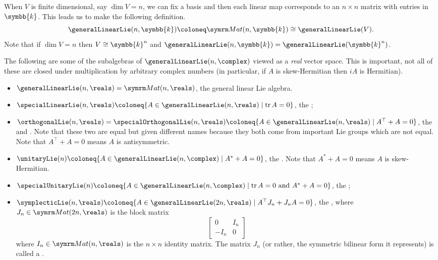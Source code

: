 \documentclass[fleqn]{NotesClass}
\renewcommand{\field}{\symbb{k}}
\newcommand{\isomorphic}{\cong}
\newcommand{\trans}{{\top}}
\newcommand{\hermit}{*}
\DeclareMathOperator{\tr}{tr}
\begin{document}
    When \(V\) is finite dimensional, say \(\dim V = n\), we can fix a basis and then each linear map corresponds to an \(n \times n\) matrix with entries in \(\field\).
    This leads us to make the following definition.
    \begin{equation}
        \generalLinearLie(n, \field) \coloneq \matrices{n}{\field} \isomorphic \generalLinearLie(V).
    \end{equation}
    Note that if \(\dim V = n\) then \(V \isomorphic \field^n\) and \(\generalLinearLie(n, \field) = \generalLinearLie(\field^n)\).
    
    The following are some of the subalgebras of \(\generalLinearLie(n, \complex)\) viewed as a \emph{real} vector space.
    This is important, not all of these are closed under multiplication by arbitrary complex numbers (in particular, if \(A\) is skew-Hermitian then \(iA\) is Hermitian).
    \begin{itemize}
        \item \(\generalLinearLie(n, \reals) = \matrices{n}{\reals}\), the general linear Lie algebra.
        \item \(\specialLinearLie(n, \reals) \coloneq \{A \in \generalLinearLie(n, \reals) \mid \tr A = 0\}\), the ;
        \item \(\orthogonalLie(n, \reals) = \specialOrthogonalLie(n, \reals) \coloneq \{A \in \generalLinearLie(n, \reals) \mid A^{\trans} + A = 0\}\), the  and .
        Note that these two are equal but given different names because they both come from important Lie groups which are not equal.
        Note that \(A^{\trans} + A = 0\) means \(A\) is antisymmetric.
        \item \(\unitaryLie(n) \coloneq \{A \in \generalLinearLie(n, \complex) \mid A^{\hermit} + A = 0\}\), the .
        Note that \(A^{\hermit} + A = 0\) means \(A\) is skew-Hermitian.
        \item \(\specialUnitaryLie(n) \coloneq \{A \in \generalLinearLie(n, \complex) \mid \tr A = 0 \text{ and } A^* + A = 0\}\), the ;
        \item \(\symplecticLie(n, \reals) \coloneq \{A \in \generalLinearLie(2n, \reals) \mid A^\trans J_n + J_n A = 0\}\), the , where \(J_n \in \matrices{2n}{\reals}\) is the block matrix
        \begin{equation}
            \begin{bmatrix}
                0 & I_n\\
                -I_n & 0
            \end{bmatrix}
        \end{equation}
        where \(I_n \in \matrices{n}{\reals}\) is the \(n \times n\) identity matrix.
        The matrix \(J_n\) (or rather, the symmetric bilinear form it represents) is called a .
    \end{itemize}
    
\end{document}
